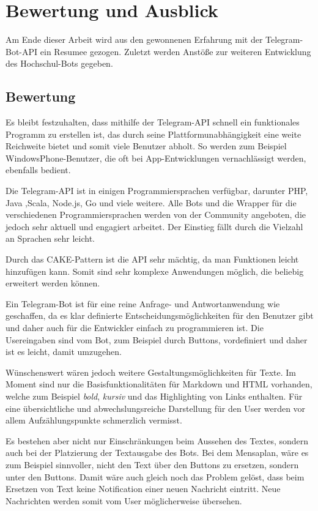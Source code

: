 \chapter{Bewertung und Ausblick}
Am Ende dieser Arbeit wird aus den gewonnenen Erfahrung mit der Telegram-Bot-API ein Resumee gezogen. Zuletzt werden Anstöße zur weiteren Entwicklung des Hochschul-Bots gegeben.

\section{Bewertung}
Es bleibt festzuhalten, dass mithilfe der Telegram-API schnell ein funktionales Programm zu erstellen ist, das durch seine Plattformunabhängigkeit eine weite Reichweite bietet und somit viele Benutzer abholt. So werden zum Beispiel WindowsPhone-Benutzer, die oft bei App-Entwicklungen vernachlässigt werden, ebenfalls bedient.

Die Telegram-API ist in einigen Programmiersprachen verfügbar, darunter PHP, Java ,Scala, Node.js, Go und viele weitere. Alle Bots und die Wrapper für die verschiedenen Programmiersprachen werden von der Community angeboten, die jedoch sehr aktuell und engagiert arbeitet. Der Einstieg fällt durch die Vielzahl an Sprachen sehr leicht.

Durch das CAKE-Pattern ist die API sehr mächtig, da man Funktionen leicht hinzufügen kann. Somit sind sehr komplexe Anwendungen möglich, die beliebig erweitert werden können.

Ein Telegram-Bot ist für eine reine Anfrage- und Antwortanwendung wie geschaffen, da es klar definierte Entscheidungsmöglichkeiten für den Benutzer gibt und daher auch für die Entwickler einfach zu programmieren ist. Die Usereingaben sind vom Bot, zum Beispiel durch Buttons, vordefiniert und daher ist es leicht, damit umzugehen.

Wünschenswert wären jedoch weitere Gestaltungsmöglichkeiten für Texte. Im Moment sind nur die Basisfunktionalitäten für Markdown und HTML vorhanden, welche zum Beispiel \emph{bold}, \emph{kursiv} und das Highlighting von Links enthalten.
Für eine übersichtliche und abwechslungsreiche Darstellung für den User werden vor allem Aufzählungspunkte schmerzlich vermisst.

Es bestehen aber nicht nur Einschränkungen beim Aussehen des Textes, sondern auch bei der Platzierung der Textausgabe des Bots.
Bei dem Mensaplan, wäre es zum Beispiel sinnvoller, nicht den Text über den Buttons zu ersetzen, sondern unter den Buttons. Damit wäre auch gleich noch das Problem gelöst, dass beim Ersetzen von Text keine Notification einer neuen Nachricht eintritt. Neue Nachrichten werden somit vom User möglicherweise übersehen.

